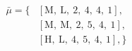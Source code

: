\begin{equation}
\nonumber
\begin{aligned}
\bar{\mu} = \{  & \left[\text{M}, \ \text{L}, \ \text{2}, \ \text{4}, \ \text{4}, \ \text{1}\right], \\  & \left[\text{M}, \ \text{M}, \ \text{2}, \ \text{5}, \ \text{4}, \ \text{1}\right], \\  & \left[\text{H}, \ \text{L}, \ \text{4}, \ \text{5}, \ \text{4}, \ \text{1}\right], \} \\ 
\end{aligned}
\end{equation} \\ 